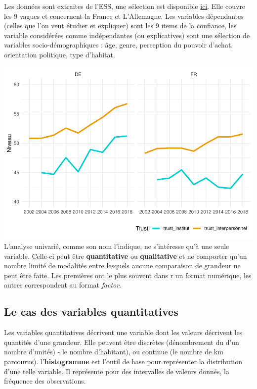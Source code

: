 \documentclass[
]{book}
\begin{document}
Les données sont extraites de l'ESS, une sélection est disponible \href{}{ici}. Elle couvre les 9 vagues et concernent la France et L'Allemagne. Les variables dépendantes (celles que l'on veut étudier et expliquer) sont les 9 items de la confiance, les variable considérées comme indépendantes (ou explicatives) sont une sélection de variables socio-démographiques : âge, genre, perception du pouvoir d'achat, orientation politique, type d'habitat.

\includegraphics{bookdown-demo_files/figure-latex/301-1.pdf}
L'analyse univarié, comme son nom l'indique, ne s'intéresse qu'à une seule variable. Celle-ci peut être \textbf{quantitative} ou \textbf{qualitative} et ne comporter qu'un nombre limité de modalités entre lesquels aucune comparaison de grandeur ne peut être faite. Les premières ont le plus souvent dans r un format numérique, les autres correspondent au format \emph{factor}.

\hypertarget{le-cas-des-variables-quantitatives}{%
\subsection{Le cas des variables quantitatives}\label{le-cas-des-variables-quantitatives}}

Les variables quantitatives décrivent une variable dont les valeurs décrivent les quantités d'une grandeur. Elle peuvent être discrètes (dénombrement du d'un nombre d'unités) - le nombre d'habitant), ou continue (le nombre de km parcourus). l'\textbf{histogramme} est l'outil de base pour représenter la distribution d'une telle variable. Il représente pour des intervalles de valeurs donnés, la fréquence des observations.
\end{document}
